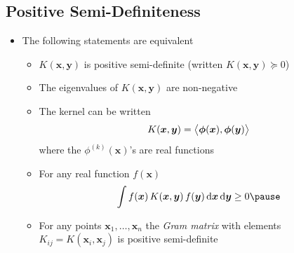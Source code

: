 \begin{slide}
\section[-2]{Positive Semi-Definiteness}

\begin{PauseHighLight}
  \begin{itemize}\squeeze
  \item The following statements are equivalent
    \begin{itemize}
    \item $K(\bm{x}, \bm{y})$ is positive semi-definite (written
      $K(\bm{x}, \bm{y})\succeq 0$)\pause
    \item The eigenvalues of $K(\bm{x}, \bm{y})$ are non-negative\pause
    \item The kernel can be written
      \begin{align*}
        K(\bm{x}, \bm{y}) =  \left\langle {\strut\bm{\phi}(\bm{x})}, {\bm{\phi}(\bm{y})}\right\rangle
      \end{align*}
      where the $\phi^{(k)}(\bm{x})$'s are real functions\pause
    \item For any real function $f(\bm{x})$
      \begin{align*}
        \int f(\bm{x})\, K(\bm{x}, \bm{y}) \, f(\bm{y})
         \, \dd \bm{x}  \, \dd \bm{y} \geq 0\pause
      \end{align*}
    \item For any points $\bm{x}_1,\ldots,\bm{x}_n$ the \emph{Gram
        matrix} with elements $K_{ij}=K(\bm{x}_i,\bm{x}_j)$ is positive
      semi-definite\pause
    \end{itemize}
  \end{itemize}
\end{PauseHighLight}

\end{slide}

